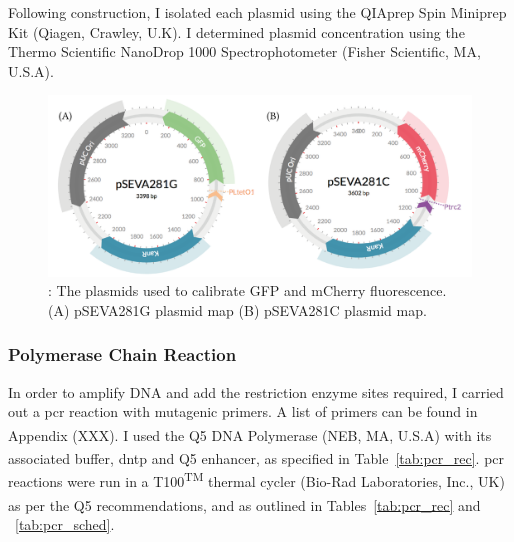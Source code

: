 Following construction, I isolated each plasmid using the QIAprep Spin Miniprep Kit (Qiagen, Crawley, U.K). I determined plasmid concentration using the Thermo Scientific NanoDrop 1000 Spectrophotometer (Fisher Scientific, MA, U.S.A).

\begin{figure}[t]
	\begin{center}
		\includegraphics[width=\textwidth]{chapterCharacterisation/images/plasmids_constructed.png}
		\caption[LoF caption]{\label{fig:psevas}: The plasmids used to calibrate GFP and mCherry fluorescence. (A) pSEVA281G plasmid map (B) pSEVA281C plasmid map.  }
	\end{center}
\end{figure}

\subsubsection{Polymerase Chain Reaction}
\label{sec:pcr}
In order to amplify DNA and add the restriction enzyme sites required, I carried out a \acrfull{pcr} reaction with mutagenic primers. A list of primers can be found in Appendix (XXX). I used the Q5\textsuperscript{\textregistered} DNA Polymerase (NEB, MA, U.S.A) with its associated buffer, \acrshort{dntp} and Q5\textsuperscript{\textregistered} enhancer, as specified in Table~\ref{tab:pcr_rec}. \acrshort{pcr} reactions were run in a T100\textsuperscript{TM} thermal cycler (Bio-Rad Laboratories, Inc., UK) as per the Q5\textsuperscript{\textregistered} recommendations, and as outlined in Tables~\ref{tab:pcr_rec} and ~\ref{tab:pcr_sched}.

